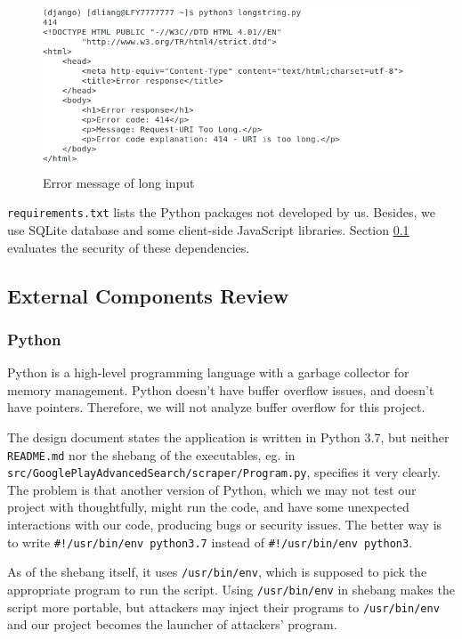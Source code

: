 \documentclass[12pt, a4paper]{article}
\newcommand{\code}[1]{\texttt{#1}}
\begin{document}
\begin{figure}[ht]
\centering
\includegraphics[width=\textwidth]{fuzz-test1.png}
\caption{Error message of long input}
\label{fig:fuzz-test1}
\end{figure}


\code{requirements.txt} lists the Python packages not developed by us. Besides, we use SQLite database and some client-side JavaScript libraries. Section \ref{dependency-evaluation} evaluates the security of these dependencies.


\subsection{External Components Review}
\label{dependency-evaluation}
\subsubsection{Python}
Python is a high-level programming language with a garbage collector for memory management. Python doesn't have buffer overflow issues, and doesn't have pointers. Therefore, we will not analyze buffer overflow for this project.

The design document states the application is written in Python 3.7, but neither \code{README.md} nor the shebang of the executables, eg. in \code{src/\linebreak[0]GooglePlayAdvancedSearch/scraper/Program.py}, specifies it very clearly. The problem is that another version of Python, which we may not test our project with thoughtfully, might run the code, and have some unexpected interactions with our code, producing bugs or security issues. The better way is to write \code{\#!/usr/bin/env python3.7} instead of \code{\#!/usr/bin/env python3}.

As of the shebang itself, it uses \code{/usr/bin/env}, which is supposed to pick the appropriate program to run the script. Using \code{/usr/bin/env} in shebang makes the script more portable, but attackers may inject their programs to \code{/usr/bin/env} and our project becomes the launcher of attackers' program.
\end{document}

